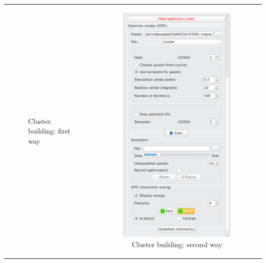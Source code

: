 \documentclass[10pt]{article}
\begin{document}
\begin{tabular}{lcr}
\begin{minipage}{.3\linewidth}
\begin{figure}[H]
\begin{center}
        \end{center}
        \vspace*{4mm}
        \caption{Cluster building: first way\label{fig:4_10_1}}
    \end{figure}
\end{minipage}
&
\begin{minipage}{.3\linewidth}
    \begin{figure}[H]
        \begin{center}
            \vspace*{0mm}
            \includegraphics[width=0.665\linewidth]{damqt320_mespimizer_2.png}
        \end{center}
        \vspace*{5mm}
        \caption{Cluster building: second way\label{fig:4_10_2}}
    \end{figure}
\end{minipage}
&
\begin{minipage}{.3\linewidth}

\end{minipage}
\end{tabular}
\end{document}
